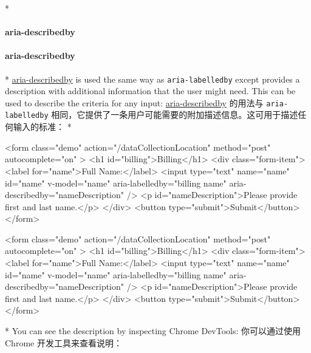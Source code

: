 \begin{paracol}{2} 
 
\switchcolumn[0]*%
\paragraph{aria-describedby}
\switchcolumn
\paragraph{aria-describedby}
\switchcolumn[0]*%
\href{https://developer.mozilla.org/en-US/docs/Web/Accessibility/ARIA/Attributes/aria-describedby}{aria-describedby}
is used the same way as \texttt{aria-labelledby} except provides a
description with additional information that the user might need. This
can be used to describe the criteria for any input:
\switchcolumn
\href{https://developer.mozilla.org/en-US/docs/Web/Accessibility/ARIA/Attributes/aria-describedby}{aria-describedby}
的用法与 \texttt{aria-labelledby}
相同，它提供了一条用户可能需要的附加描述信息。这可用于描述任何输入的标准：
\switchcolumn[0]*%
\begin{codeHtml}
<form
  class="demo"
  action="/dataCollectionLocation"
  method="post"
  autocomplete="on"
>
  <h1 id="billing">Billing</h1>
  <div class="form-item">
    <label for="name">Full Name:</label>
    <input
      type="text"
      name="name"
      id="name"
      v-model="name"
      aria-labelledby="billing name"
      aria-describedby="nameDescription"
    />
    <p id="nameDescription">Please provide first and last name.</p>
  </div>
  <button type="submit">Submit</button>
</form>
\end{codeHtml}
\switchcolumn
\begin{codeHtml}
<form
  class="demo"
  action="/dataCollectionLocation"
  method="post"
  autocomplete="on"
>
  <h1 id="billing">Billing</h1>
  <div class="form-item">
    <label for="name">Full Name:</label>
    <input
      type="text"
      name="name"
      id="name"
      v-model="name"
      aria-labelledby="billing name"
      aria-describedby="nameDescription"
    />
    <p id="nameDescription">Please provide first and last name.</p>
  </div>
  <button type="submit">Submit</button>
</form>
\end{codeHtml}
\switchcolumn[0]*%
You can see the description by inspecting Chrome DevTools:
\switchcolumn
你可以通过使用 Chrome 开发工具来查看说明：
\end{paracol}

